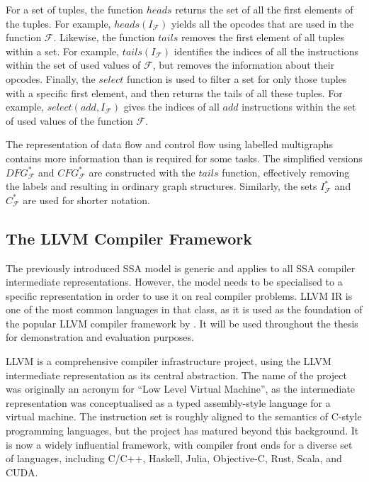     For a set of tuples, the function $heads$ returns the set of all the first
    elements of the tuples.
    For example, $heads(I_\mathcal F)$ yields all the opcodes that are used in
    the function $\mathcal F$.
    Likewise, the function $tails$ removes the first element of all
    tuples within a set.
    For example, $tails(I_\mathcal F)$ identifies the indices of all the
    instructions within the set of used values of $\mathcal F$, but removes the
    information about their opcodes.
    Finally, the $select$ function is used to filter a set for only those tuples
    with a specific first element, and then returns the tails of all these
    tuples.
    For example, $select(add,I_\mathcal F)$ gives the indices of all $add$
    instructions within the set of used values of the function $\mathcal F$.

    The representation of data flow and control flow using labelled multigraphs
    contains more information than is required for some tasks.
    The simplified versions $DFG_\mathcal F^*$ and $CFG_\mathcal F^*$ are
    constructed with the $tails$ function, effectively removing the labels and
    resulting in ordinary graph structures.
    Similarly, the sets $I_\mathcal F^*$ and $C_\mathcal F^*$ are used for
    shorter notation.

\subsection{The LLVM Compiler Framework}

    The previously introduced SSA model is generic and applies to all SSA
    compiler intermediate representations.
    However, the model needs to be specialised to a specific representation in
    order to use it on real compiler problems.
    LLVM IR is one of the most common languages in that class, as it is
    used as the foundation of the popular LLVM compiler framework by
    \citet{lattner2004llvm}.
    It will be used throughout the thesis for demonstration and evaluation
    purposes.

    LLVM is a comprehensive compiler infrastructure project, using the LLVM
    intermediate representation as its central abstraction.
    The name of the project was originally an acronym for
    ``Low Level Virtual Machine'', as the intermediate representation was
    conceptualised as a typed assembly-style language for a virtual machine.
    The instruction set is roughly aligned to the semantics of C-style
    programming languages, but the project has matured beyond this background.
    It is now a widely influential framework, with compiler front ends
    for a diverse set of languages, including C/C++, Haskell, Julia,
    Objective-C, Rust, Scala, and CUDA.

